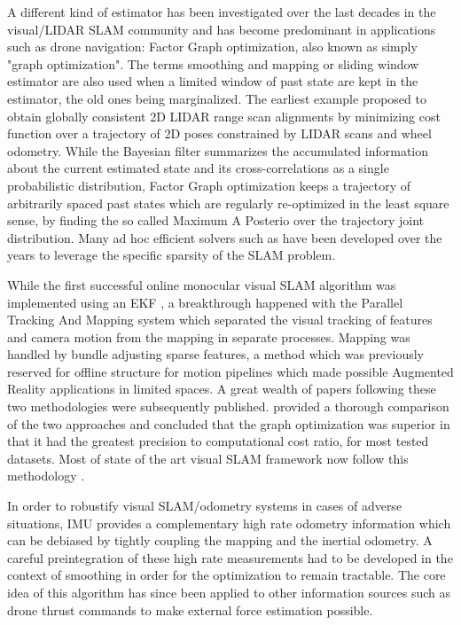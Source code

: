 A different kind of estimator has been investigated over the last decades in the visual/LIDAR SLAM community and has become predominant in applications
such as drone navigation: Factor Graph optimization, also known as simply "graph optimization". The terms smoothing and mapping or sliding window estimator are
also used when a limited window of past state are kept in the estimator, the old ones being marginalized. The earliest example \cite{lu1997globally} 
proposed to obtain globally consistent 2D LIDAR range scan alignments by minimizing cost function over a trajectory of 2D poses constrained by LIDAR scans and wheel odometry.
While the Bayesian filter summarizes the accumulated information about the current estimated state and its cross-correlations as a single probabilistic distribution, 
Factor Graph optimization keeps a trajectory of arbitrarily spaced past states which are regularly re-optimized in the least square sense, by finding the so called 
Maximum A Posterio over the trajectory joint distribution. Many ad hoc efficient solvers such as \cite{grisetti2011g2o, dellaert2012factor, ila2017slam++, ceres-solver} have been developed 
over the years to leverage the specific sparsity of the SLAM problem.

While the first successful online monocular visual SLAM algorithm was implemented using an EKF \cite{davison2007monoslam}, a breakthrough happened with the 
Parallel Tracking And Mapping system \cite{klein2009parallel} which separated the visual tracking of features and camera motion from the 
mapping in separate processes. Mapping was handled by bundle adjusting sparse features, a method which was previously reserved for offline 
structure for motion pipelines \cite{triggs1999bundle} which made possible Augmented Reality applications in limited spaces. 
A great wealth of papers following these two methodologies were subsequently published. \cite{strasdat2012visual} provided a thorough comparison 
of the two approaches and concluded that the graph optimization was superior in that it had the greatest precision to 
computational cost ratio, for most tested datasets. Most of state of the art visual SLAM framework now follow this methodology 
\cite{forster2017-TRO, mur2015orb, qin2018vins, leutenegger2015keyframe, ferrera2021ov}.

In order to robustify visual SLAM/odometry systems in cases of adverse situations, IMU provides a complementary high rate odometry information which can 
be debiased by tightly coupling the mapping and the inertial odometry. A careful preintegration \cite{lupton-09,forster2017-TRO} of these high 
rate measurements had to be developed in the context of smoothing in order for the optimization to remain tractable. The core idea of this algorithm has 
since been applied to other information sources such as drone thrust commands \cite{nisar2019vimo} to make external force estimation possible.

